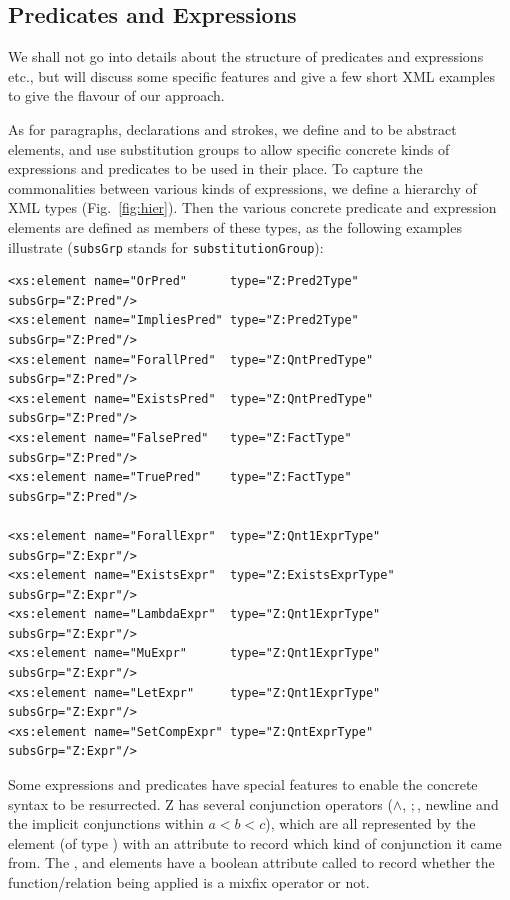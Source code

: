 \documentclass{llncs}  %
\begin{document}


\subsection{Predicates and Expressions} \label{sec:expr}

We shall not go into details about the structure of predicates and
expressions etc., but will discuss some specific features and give
a few short XML examples to give the flavour of our approach.

As for paragraphs, declarations and strokes, we define 
and  to be abstract elements, and use substitution
groups to allow specific concrete kinds of expressions and predicates to be
used in their place.  To capture the commonalities between various 
kinds of expressions, we define a hierarchy of XML types
(Fig.~\ref{fig:hier}).   Then the various concrete predicate and
expression elements are defined as members of these types, as the
following examples illustrate (\verb!subsGrp! stands for
\verb!substitutionGroup!):
\begin{small}
\begin{verbatim}
<xs:element name="OrPred"      type="Z:Pred2Type"      subsGrp="Z:Pred"/>
<xs:element name="ImpliesPred" type="Z:Pred2Type"      subsGrp="Z:Pred"/>
<xs:element name="ForallPred"  type="Z:QntPredType"    subsGrp="Z:Pred"/>
<xs:element name="ExistsPred"  type="Z:QntPredType"    subsGrp="Z:Pred"/>
<xs:element name="FalsePred"   type="Z:FactType"       subsGrp="Z:Pred"/>
<xs:element name="TruePred"    type="Z:FactType"       subsGrp="Z:Pred"/>

<xs:element name="ForallExpr"  type="Z:Qnt1ExprType"   subsGrp="Z:Expr"/>
<xs:element name="ExistsExpr"  type="Z:ExistsExprType" subsGrp="Z:Expr"/>
<xs:element name="LambdaExpr"  type="Z:Qnt1ExprType"   subsGrp="Z:Expr"/>
<xs:element name="MuExpr"      type="Z:Qnt1ExprType"   subsGrp="Z:Expr"/>
<xs:element name="LetExpr"     type="Z:Qnt1ExprType"   subsGrp="Z:Expr"/>
<xs:element name="SetCompExpr" type="Z:QntExprType"    subsGrp="Z:Expr"/>
\end{verbatim}
\end{small}

Some expressions and predicates have special features to enable the
concrete syntax to be resurrected.  Z has several
conjunction operators ($\land$, $;$, newline and the implicit conjunctions
within $a < b < c$), which are all represented by the 
element (of type ) with an attribute to record which
kind of conjunction it came from.  The , 
and  elements have a boolean attribute called 
to record whether the function/relation being applied is a mixfix operator
or not.
\end{document}

